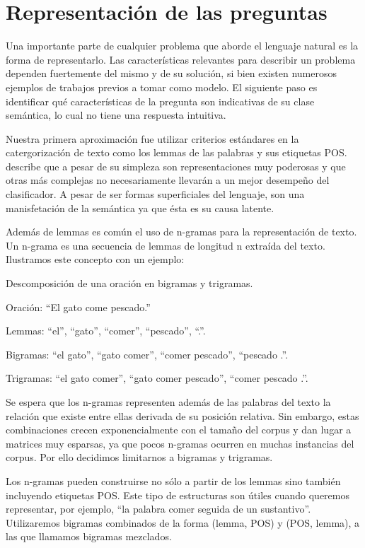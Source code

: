 \chapter{Representación de las preguntas}\label{capitulo-features}

Una importante parte de cualquier problema que aborde el lenguaje natural es la forma de representarlo. Las características relevantes para describir un problema dependen fuertemente del mismo y de su solución, si bien existen numerosos ejemplos de trabajos previos a tomar como modelo. El siguiente paso es identificar qué características de la pregunta son indicativas de su clase semántica, lo cual no tiene una respuesta intuitiva.

Nuestra primera aproximación fue utilizar criterios estándares en la catergorización de texto como los lemmas de las palabras y sus etiquetas POS. \citet{Sebastiani-text-categorization} describe que a pesar de su simpleza son representaciones muy poderosas y que otras más complejas no necesariamente llevarán a un mejor desempeño del clasificador. A pesar de ser formas superficiales del lenguaje, son una manisfetación de la semántica ya que ésta es su causa latente.

Además de lemmas es común el uso de n-gramas para la representación de texto. Un n-grama es una secuencia de lemmas de longitud n extraída del texto. Ilustramos este concepto con un ejemplo:

\begin{example} Descomposición de una oración en bigramas y trigramas.

Oración: ``El gato come pescado.''

Lemmas: ``el'', ``gato'', ``comer'', ``pescado'', ``.''.

Bigramas: ``el gato'', ``gato comer'', ``comer pescado'', ``pescado .''.

Trigramas: ``el gato comer'', ``gato comer pescado'', ``comer pescado .''.

\end{example}

Se espera que los n-gramas representen además de las palabras del texto la relación que existe entre ellas derivada de su posición relativa. Sin embargo, estas combinaciones crecen exponencialmente con el tamaño del corpus y dan lugar a matrices muy esparsas, ya que pocos n-gramas ocurren en muchas instancias del corpus. Por ello decidimos limitarnos a bigramas y trigramas.

Los n-gramas pueden construirse no sólo a partir de los lemmas sino también incluyendo etiquetas POS. Este tipo de estructuras son útiles cuando queremos representar, por ejemplo, ``la palabra comer seguida de un sustantivo''. Utilizaremos bigramas combinados de la forma (lemma, POS) y (POS, lemma), a las que llamamos bigramas mezclados.

